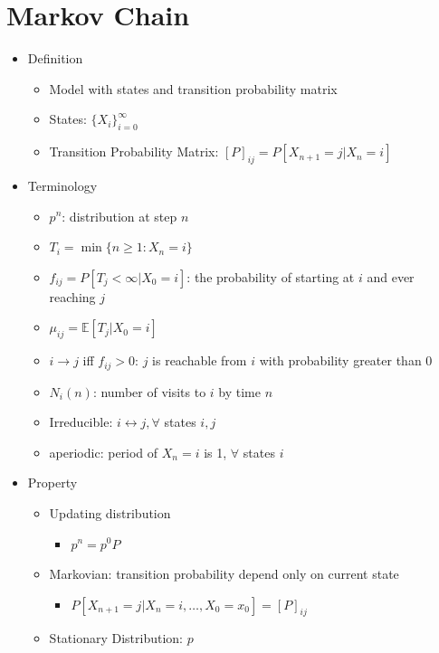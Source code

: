 \documentclass[a4paper]{article}
\begin{document}
\section{Markov Chain}
\begin{itemize}
    \item Definition
        \begin{itemize}
            \item Model with states and transition probability matrix
            \item States: $\{X_i\}_{i=0}^\infty$
            \item Transition Probability Matrix: $[P]_{ij} = P[X_{n+1} = j|X_n = i]$
        \end{itemize}
    \item Terminology
        \begin{itemize}
            \item $p^n$: distribution at step $n$
            \item $T_i = \min\{n \geq 1: X_n = i\}$
            \item $f_{ij} = P[T_j < \infty | X_0 = i]$: the probability of starting at $i$ and ever reaching $j$
            \item $\mu_{ij} = \mathbb{E}[T_j | X_0 = i]$
            \item $i \rightarrow j$ iff $f_{ij} > 0$: $j$ is reachable from $i$ with probability greater than 0
            \item $N_i(n)$: number of visits to $i$ by time $n$
            \item Irreducible: $i \leftrightarrow j, \forall$ states $i, j$
            \item aperiodic: period of $X_n = i$ is 1, $\forall$ states $i$
        \end{itemize}
    \item Property
        \begin{itemize}
            \item Updating distribution
                \begin{itemize}
                    \item $p^n = p^0 P$
                \end{itemize}
            \item Markovian: transition probability depend only on current state
                \begin{itemize}
                    \item $P[X_{n+1} = j|X_n = i, \dots, X_0 = x_0] = [P]_{ij}$
                \end{itemize}
            \item Stationary Distribution: $p$


\end{itemize}
\end{itemize}
\end{document}
